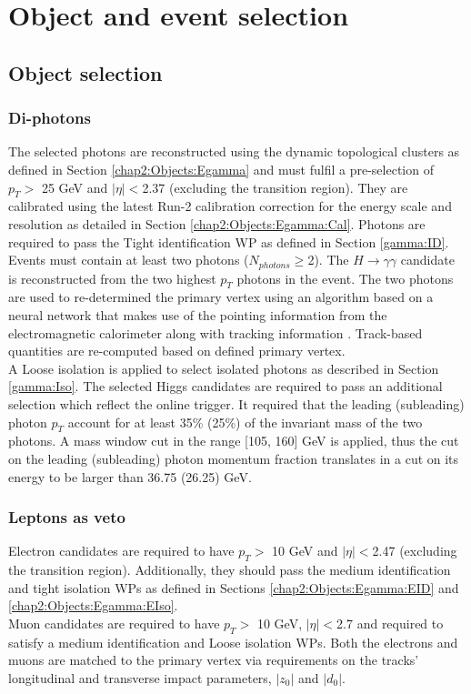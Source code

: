 \section{Object and event selection}
\label{HHyybb:ObjEvt}

\subsection{Object selection}
\label{HHyybb:ObjEvt:Obj}

\subsubsection{Di-photons}
\label{HHyybb:ObjEvt:Obj:gamma}
The selected photons are reconstructed using the dynamic topological clusters as defined in Section \ref{chap2:Objects:Egamma} and must fulfil a pre-selection of $p_T > $ 25 GeV and $|\eta| < $2.37 (excluding the transition region). They are calibrated using the latest Run-2 calibration correction for the energy scale and resolution as detailed in Section \ref{chap2:Objects:Egamma:Cal}. Photons are required to pass the Tight identification WP as defined in Section \ref{gamma:ID}. Events must contain at least two photons ($N_{photons} \geq $2). The $H\to\gamma\gamma$ candidate is reconstructed from the two highest $p_T$ photons in the event.  
The two photons are used to re-determined the primary vertex using an algorithm based on a neural network that makes use of the pointing information from the electromagnetic calorimeter along with tracking information \cite{DiPhotonVertex}. Track-based quantities are re-computed based on defined primary vertex. \\
A Loose isolation is applied to select isolated photons as described in Section \ref{gamma:Iso}.
The selected Higgs candidates are required to pass an additional selection which reflect the online trigger. It required that the leading (subleading) photon $p_T$ account for at least 35\% (25\%) of the invariant mass of the two photons. A mass window cut in the range [105, 160] GeV is applied, thus the cut on the leading (subleading) photon momentum fraction translates in a cut on its energy to be larger than 36.75 (26.25) GeV.

\subsubsection{Leptons as veto}
\label{HHyybb:ObjEvt:Obj:lepton}

Electron candidates are required to have $p_T > $ 10 GeV and $|\eta| < $2.47 (excluding the transition region). Additionally, they should pass the medium identification and tight isolation WPs as defined in Sections \ref{chap2:Objects:Egamma:EID} and \ref{chap2:Objects:Egamma:EIso}. \\
Muon candidates are required to have $p_T > $ 10 GeV, $|\eta| < $2.7 and required to satisfy a medium identification and Loose isolation WPs. Both the electrons and muons are matched to the primary vertex via requirements on the tracks' longitudinal and transverse impact parameters, $|z_0|$ and $|d_0|$.

